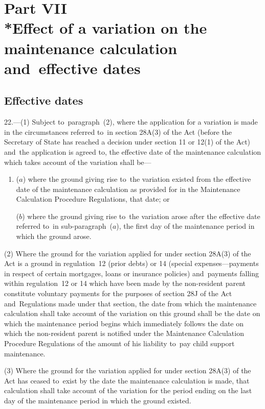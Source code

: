 \documentclass[12pt,a4paper]{article}
\begin{document}
\section[Part VII --- Effect of a variation on the maintenance calculation and~effective dates]{Part VII\\*Effect of a variation on the maintenance calculation and~effective dates}

\renewcommand\parthead{--- Part VII}

\subsection[22. Effective dates]{Effective dates}

22.---(1)  Subject to~paragraph~(2), where the application for a variation is made in the circumstances referred to~in section 28A(3) of the Act (before the Secretary of State has reached a decision under section 11 or 12(1) of the Act) and~the application is agreed to, the effective date of the maintenance calculation which takes account of the variation shall be—
\begin{enumerate}\item[]
($a$) where the ground giving rise to~the variation existed from the effective date of the maintenance calculation as provided for in the Maintenance Calculation Procedure Regulations, that date; or

($b$) where the ground giving rise to~the variation arose after the effective date referred to~in sub-paragraph~($a$), the first day of the maintenance period in which the ground arose.
\end{enumerate}

(2) Where the ground for the variation applied for under section 28A(3) of the Act is a ground in regulation~12 (prior debts) or 14 (special expenses—payments in respect of certain mortgages, loans or insurance policies) and~payments falling within regulation~12 or 14 which have been made by the non-resident parent constitute voluntary payments for the purposes of section 28J of the Act and~Regulations made under that section, the date from which the maintenance calculation shall take account of the variation on this ground shall be the date on which the maintenance period begins which immediately follows the date on which the non-resident parent is notified under the Maintenance Calculation Procedure Regulations of the amount of his liability to~pay child support maintenance.

(3) Where the ground for the variation applied for under section 28A(3) of the Act has ceased to~exist by the date the maintenance calculation is made, that calculation shall take account of the variation for the period ending on the last day of the maintenance period in which the ground existed.
\end{document}
